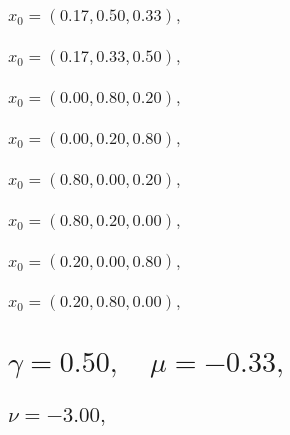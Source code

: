 \documentclass[a4paper]{article}
\begin{document}
\begin{multicols*}{2}
   \subsubsection{\(x_0 = (0.17,0.50,0.33),\quad \)}
   

   \subsubsection{\(x_0 = (0.17,0.33,0.50),\quad \)}
   

   \subsubsection{\(x_0 = (0.00,0.80,0.20),\quad \)}
   

   \subsubsection{\(x_0 = (0.00,0.20,0.80),\quad \)}
   

   \subsubsection{\(x_0 = (0.80,0.00,0.20),\quad \)}
   

   \subsubsection{\(x_0 = (0.80,0.20,0.00),\quad \)}
   

   \subsubsection{\(x_0 = (0.20,0.00,0.80),\quad \)}
   

   \subsubsection{\(x_0 = (0.20,0.80,0.00),\quad \)}
   

   \section{\(\gamma = 0.50,\quad \mu = -0.33,\quad \)}
   

   \subsection{\(\nu = -3.00,\quad \)}
   


\end{multicols*}
\end{document}
